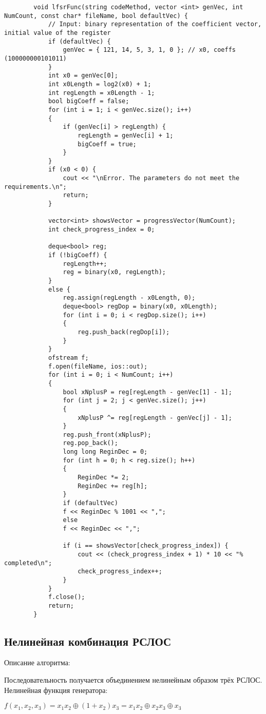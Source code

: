\documentclass[bachelor, och, coursework]{shiza}
\begin{document}
	\begin{verbatim}
		void lfsrFunc(string codeMethod, vector <int> genVec, int NumCount, const char* fileName, bool defaultVec) {
			// Input: binary representation of the coefficient vector, initial value of the register
			if (defaultVec) {
				genVec = { 121, 14, 5, 3, 1, 0 }; // x0, coeffs (100000000101011)
			}
			int x0 = genVec[0];
			int x0Length = log2(x0) + 1;
			int regLength = x0Length - 1;
			bool bigCoeff = false;
			for (int i = 1; i < genVec.size(); i++)
			{
				if (genVec[i] > regLength) {
					regLength = genVec[i] + 1;
					bigCoeff = true;
				}
			}
			if (x0 < 0) {
				cout << "\nError. The parameters do not meet the requirements.\n";
				return;
			}
			
			vector<int> showsVector = progressVector(NumCount);
			int check_progress_index = 0;
			
			deque<bool> reg;
			if (!bigCoeff) {
				regLength++;
				reg = binary(x0, regLength);
			}
			else {
				reg.assign(regLength - x0Length, 0);
				deque<bool> regDop = binary(x0, x0Length);
				for (int i = 0; i < regDop.size(); i++)
				{
					reg.push_back(regDop[i]);
				}
			}
			ofstream f;
			f.open(fileName, ios::out);
			for (int i = 0; i < NumCount; i++)
			{
				bool xNplusP = reg[regLength - genVec[1] - 1];
				for (int j = 2; j < genVec.size(); j++)
				{
					xNplusP ^= reg[regLength - genVec[j] - 1];
				}
				reg.push_front(xNplusP);
				reg.pop_back();
				long long ReginDec = 0;
				for (int h = 0; h < reg.size(); h++)
				{
					ReginDec *= 2;
					ReginDec += reg[h];
				}
				if (defaultVec)
				f << ReginDec % 1001 << ",";
				else
				f << ReginDec << ",";
				
				if (i == showsVector[check_progress_index]) {
					cout << (check_progress_index + 1) * 10 << "% completed\n";
					check_progress_index++;
				}
			}
			f.close();
			return;
		}
	\end{verbatim}
	

	\subsection{Нелинейная комбинация РСЛОС}
	
	Описание алгоритма:
	
	Последовательность получается объединением нелинейным образом трёх РСЛОС. Нелинейная функция генератора:
	\begin{center}
		$f(x_1, x_2, x_3) = x_1 x_2 \oplus (1 + x_2) x_3 = x_1 x_2 \oplus x_2 x_3 \oplus x_3$
	\end{center}
	
\end{document}
